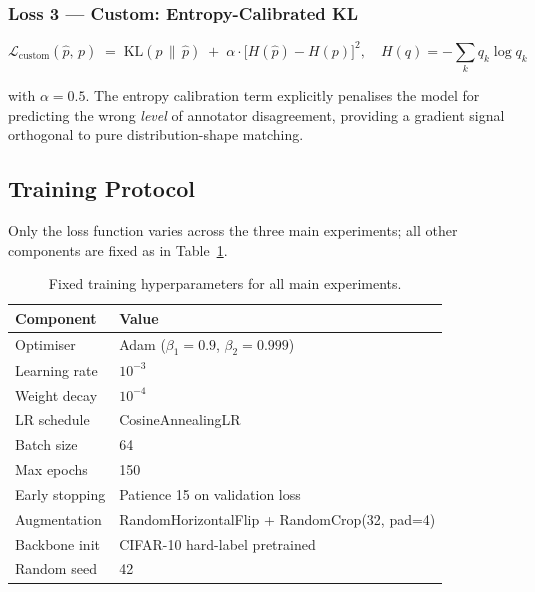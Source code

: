 \documentclass[11pt,a4paper]{article}
\newcommand{\KL}{\mathrm{KL}}
\begin{document}
\subsubsection{Loss 3 — Custom: Entropy-Calibrated KL}

\begin{equation}
  \mathcal{L}_{\mathrm{custom}}(\hat{p},\, p)
  \;=\;
  \KL(p \,\|\, \hat{p})
  \;+\;
  \alpha \cdot \bigl[H(\hat{p}) - H(p)\bigr]^2,
  \quad H(q) = -\textstyle\sum_k q_k \log q_k
  \label{eq:custom}
\end{equation}

with $\alpha = 0.5$.
The entropy calibration term explicitly penalises the model for predicting the
wrong \emph{level} of annotator disagreement, providing a gradient signal
orthogonal to pure distribution-shape matching.

\subsection{Training Protocol}

Only the loss function varies across the three main experiments; all other
components are fixed as in Table~\ref{tab:training}.

\begin{table}[H]
\centering
\caption{Fixed training hyperparameters for all main experiments.}
\label{tab:training}
\begin{tabular}{ll}
\toprule
\textbf{Component} & \textbf{Value} \\
\midrule
Optimiser              & Adam ($\beta_1=0.9$, $\beta_2=0.999$) \\
Learning rate          & $10^{-3}$ \\
Weight decay           & $10^{-4}$ \\
LR schedule            & CosineAnnealingLR \\
Batch size             & 64 \\
Max epochs             & 150 \\
Early stopping         & Patience 15 on validation loss \\
Augmentation           & RandomHorizontalFlip + RandomCrop(32, pad=4) \\
Backbone init          & CIFAR-10 hard-label pretrained \\
Random seed            & 42 \\
\bottomrule
\end{tabular}
\end{table}
\end{document}
